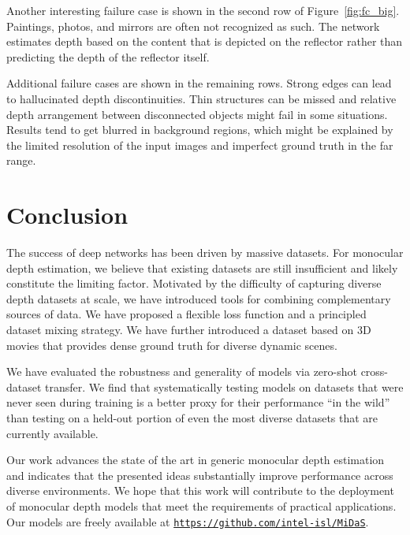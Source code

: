 Another interesting failure case is shown in the second row of Figure~\ref{fig:fc_big}. Paintings, photos, and mirrors are often not recognized as such. The network estimates depth based on the content that is depicted on the reflector rather than predicting the depth of the reflector itself.

Additional failure cases are shown in the remaining rows. Strong edges can lead to hallucinated depth discontinuities. Thin structures can be missed and relative depth arrangement between disconnected objects might fail in some situations. Results tend to get blurred in background regions, which might be explained by the limited resolution of the input images and imperfect ground truth in the far range.

\section{Conclusion}
\label{sec:conclusion}

The success of deep networks has been driven by massive datasets. For monocular depth estimation, we believe that existing datasets are still insufficient and likely constitute the limiting factor. Motivated by the difficulty of capturing diverse depth datasets at scale, we have introduced tools for combining complementary sources of data. We have proposed a flexible loss function and a principled dataset mixing strategy. We have further introduced a dataset based on 3D movies that provides dense ground truth for diverse dynamic scenes.

We have evaluated the robustness and generality of models via zero-shot cross-dataset transfer. We find that systematically testing models on datasets that were never seen during training is a better proxy for their performance ``in the wild'' than testing on a held-out portion of even the most diverse datasets that are currently available.

Our work advances the state of the art in generic monocular depth estimation and indicates that the presented ideas substantially improve performance across diverse environments. We hope that this work will contribute to the deployment of monocular depth models that meet the requirements of practical applications. Our models are freely available at \href{https://github.com/intel-isl/MiDaS}{\small\texttt{https://github.com/intel-isl/MiDaS}}.

\ifCLASSOPTIONcaptionsoff

\fi


